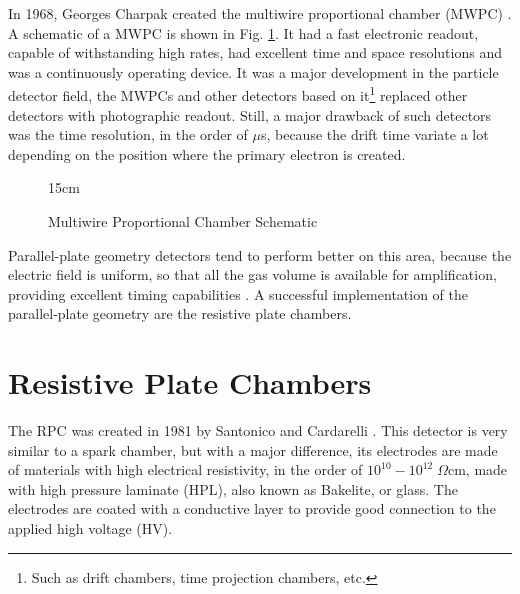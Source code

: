 In 1968, Georges Charpak created the multiwire proportional chamber (MWPC) \cite{Charpak:1968kd}. A schematic of a MWPC is shown in Fig. \ref{fig:MWPCsch}. It had a fast electronic readout, capable of withstanding high rates, had excellent time and space resolutions and was a continuously operating device. It was a major development in the particle detector field, the MWPCs and other detectors based on it\footnote{Such as drift chambers, time projection chambers, etc.} replaced other detectors with photographic readout. Still, a major drawback of such detectors was the time resolution, in the order of $\mu$s, because the drift time variate a lot depending on the position where the primary electron is created. 

\begin{figure}[!htm]{15cm}
\caption{Multiwire Proportional Chamber Schematic}%
\label{fig:MWPCsch}
\end{figure}

Parallel-plate geometry detectors tend to perform better on this area, because the electric field is uniform, so that all the gas volume is available for amplification, providing excellent timing capabilities \cite{PARKHOMCHUCK1971269}. A successful implementation of the parallel-plate geometry are the resistive plate chambers.

\section{Resistive Plate Chambers}

The RPC was created in 1981 by Santonico and Cardarelli \cite{santonico1981development}. This detector is very similar to a spark chamber, but with a major difference, its electrodes are made of materials with high electrical resistivity, in the order of $10^{10}-10^{12} \; \Omega$cm, made with high pressure laminate (HPL), also known as Bakelite, or glass. The electrodes are coated with a conductive layer to provide good connection to the applied high voltage (HV). 

